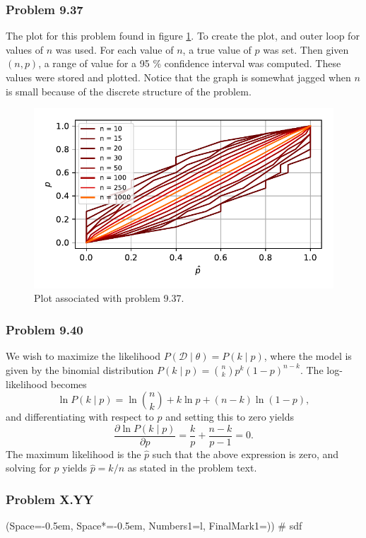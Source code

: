 \documentclass[12pt, a4paper]{article}
\newcommand{\listSpace}{-0.5em}%
\newcommand{\D}{\mathcal{D}}
\begin{document}
{\subsubsection*{Problem 9.37}
The plot for this problem found in figure \ref{fig:duda_ch9_prob37_k50}.
To create the plot, and outer loop for values of $n$ was used.
For each value of $n$, a true value of $p$ was set.
Then given $(n, p)$, a range of value for a 95 \% confidence interval was computed.
These values were stored and plotted.
Notice that the graph is somewhat jagged when $n$ is small because of the discrete structure of the problem.
	
\begin{figure}[ht!]
\centering
\includegraphics[width=0.7\linewidth]{figs/duda_ch9_prob37_k15}
\caption{Plot associated with problem 9.37.}
\label{fig:duda_ch9_prob37_k50}
\end{figure}

\subsubsection*{Problem 9.40}
We wish to maximize the likelihood $P(\D \mid \theta) = P(k \mid p)$, where the model is given by the binomial distribution 
$P(k \mid p) = \binom{n}{k} p^k (1-p)^{n-k}$.
The log-likelihood becomes
\begin{equation*}
	\ln P(k \mid p) = \ln \binom{n}{k} + k \ln p + (n-k) \ln (1-p),
\end{equation*}
and differentiating with respect to $p$ and setting this to zero yields
\begin{equation*}
\frac{\partial \ln P(k \mid p)}{\partial p} = \frac{k}{p} + \frac{n-k}{p-1} = 0.
\end{equation*}
The maximum likelihood is the $\hat{p}$ such that the above expression is zero, and solving for $p$ yields $\hat{p} = k / n$ as stated in the problem text.


\clearpage
\subsubsection*{Problem X.YY}
\begin{easylist}[enumerate]
	\ListProperties(Space=\listSpace, Space*=\listSpace, Numbers1=l, FinalMark1={)})
	# sdf
\end{easylist}


}
\end{document}
